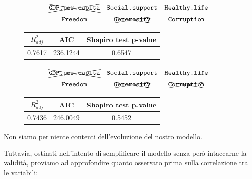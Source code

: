 \documentclass{beamer}
\begin{document}
\begin{frame}
    \begin{equation*}
    {\renewcommand*{\arraystretch}{1.4}
    \begin{array}{ccc}
    \xcancel{\texttt{GDP.per.capita}} & {\texttt{Social.support}} & {\texttt{Healthy.life}} \\
    {\texttt{Freedom}}        & \xcancel{\texttt{Generosity}}     & {\texttt{Corruption}}
    \end{array}}
    \end{equation*}

    \begin{figure}[h]
    \centering
    {\renewcommand\arraystretch{1.6}
    \begin{tabular}{|c|c|c|}
    \hline
    $R^2_{adj}$ & AIC & Shapiro test p-value \\
    \hline
    0.7617  & 236.1244 & 0.6547 \\
    \hline
    \end{tabular}}
    \end{figure}
\end{frame}

\begin{frame}
    \begin{equation*}
    {\renewcommand*{\arraystretch}{1.4}
    \begin{array}{ccc}
    \xcancel{\texttt{GDP.per.capita}} & {\texttt{Social.support}} & {\texttt{Healthy.life}} \\
    {\texttt{Freedom}}        & \xcancel{\texttt{Generosity}}     & \xcancel{\texttt{Corruption}}
    \end{array}}
    \end{equation*}

    \begin{figure}[h]
    \centering
    {\renewcommand\arraystretch{1.6}
    \begin{tabular}{|c|c|c|}
    \hline
    $R^2_{adj}$ & AIC & Shapiro test p-value \\
    \hline
    0.7436  & 246.0049 & 0.5452 \\
    \hline
    \end{tabular}}
    \end{figure}
\end{frame}

\begin{frame}
    Non siamo per niente contenti dell'evoluzione del nostro modello.

    \bigskip

    Tuttavia, ostinati nell'intento di semplificare il modello senza però intaccarne la validità, proviamo ad approfondire quanto osservato prima sulla correlazione tra le variabili:
\end{frame}
\end{document}

